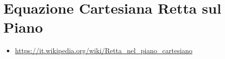 \section{Equazione Cartesiana Retta sul Piano}

\begin{osservazione}
\begin{itemize}
 \item \url{https://it.wikipedia.org/wiki/Retta_nel_piano_cartesiano}
\end{itemize}
\end{osservazione}

